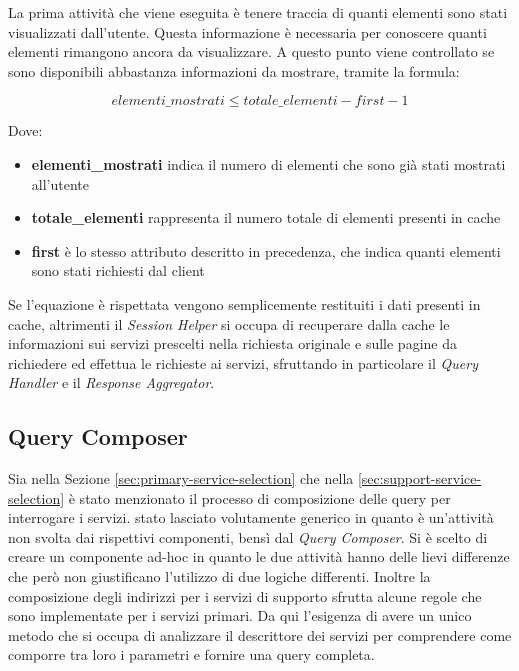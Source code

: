 La prima attività che viene eseguita è tenere traccia di quanti elementi sono stati visualizzati dall'utente. Questa informazione è necessaria per conoscere quanti elementi rimangono ancora da visualizzare. A questo punto viene controllato se sono disponibili abbastanza informazioni da mostrare, tramite la formula:

\begin{equation}
	elementi\_mostrati \le totale\_elementi - first - 1
\end{equation}

Dove:

\begin{itemize}
	\item \textbf{elementi\_mostrati} indica il numero di elementi che sono già stati mostrati all'utente
	\item \textbf{totale\_elementi} rappresenta il numero totale di elementi presenti in cache
	\item \textbf{first} è lo stesso attributo descritto in precedenza, che indica quanti elementi sono stati richiesti dal client
\end{itemize}

Se l'equazione è rispettata vengono semplicemente restituiti i dati presenti in cache, altrimenti il \emph{Session Helper} si occupa di recuperare dalla cache le informazioni sui servizi prescelti nella richiesta originale e sulle pagine da richiedere ed effettua le richieste ai servizi, sfruttando in particolare il \emph{Query Handler} e il \emph{Response Aggregator}.

\subsection{Query Composer\label{sec:query-composer}}

Sia nella Sezione \ref{sec:primary-service-selection} che nella \ref{sec:support-service-selection} è stato menzionato il processo di composizione delle query per interrogare i servizi. \upe stato lasciato volutamente generico in quanto è un'attività non svolta dai rispettivi componenti, bensì dal \emph{Query Composer}. Si è scelto di creare un componente ad-hoc in quanto le due attività hanno delle lievi differenze che però non giustificano l'utilizzo di due logiche differenti. Inoltre la composizione degli indirizzi per i servizi di supporto sfrutta alcune regole che sono implementate per i servizi primari. Da qui l'esigenza di avere un unico metodo che si occupa di analizzare il descrittore dei servizi per comprendere come comporre tra loro i parametri e fornire una query completa.

